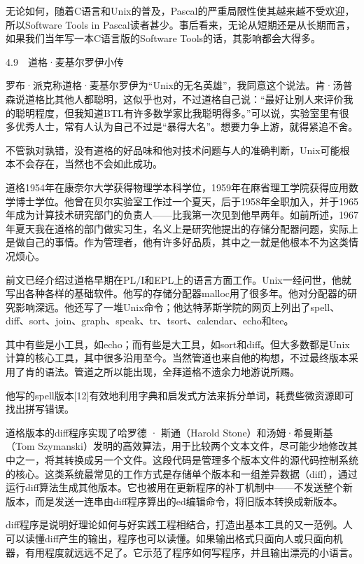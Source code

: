 \documentclass[a4paper,12pt,UTF8,twoside]{ctexbook}
\begin{document}
{无论如何，随着C语言和Unix的普及，Pascal的严重局限性使其越来越不受欢迎，所以Software Tools in Pascal读者甚少。事后看来，无论从短期还是从长期而言，如果我们当年写一本C语言版的Software Tools的话，其影响都会大得多。





4.9　道格·麦基尔罗伊小传


罗布·派克称道格·麦基尔罗伊为“Unix的无名英雄”，我同意这个说法。肯·汤普森说道格比其他人都聪明，这似乎也对，不过道格自己说：“最好让别人来评价我的聪明程度，但我知道BTL有许多数学家比我聪明得多。”可以说，实验室里有很多优秀人士，常有人认为自己不过是“暴得大名”。想要力争上游，就得紧追不舍。

不管孰对孰错，没有道格的好品味和他对技术问题与人的准确判断，Unix可能根本不会存在，当然也不会如此成功。

道格1954年在康奈尔大学获得物理学本科学位，1959年在麻省理工学院获得应用数学博士学位。他曾在贝尔实验室工作过一个夏天，后于1958年全职加入，并于1965年成为计算技术研究部门的负责人——比我第一次见到他早两年。如前所述，1967年夏天我在道格的部门做实习生，名义上是研究他提出的存储分配器问题，实际上是做自己的事情。作为管理者，他有许多好品质，其中之一就是他根本不为这类情况烦心。

前文已经介绍过道格早期在PL/I和EPL上的语言方面工作。Unix一经问世，他就写出各种各样的基础软件。他写的存储分配器malloc用了很多年。他对分配器的研究影响深远。他还写了一堆Unix命令；他达特茅斯学院的网页上列出了spell、diff、sort、join、graph、speak、tr、tsort、calendar、echo和tee。

其中有些是小工具，如echo；而有些是大工具，如sort和diff。但大多数都是Unix计算的核心工具，其中很多沿用至今。当然管道也来自他的构想，不过最终版本采用了肯的语法。管道之所以能出现，全拜道格不遗余力地游说所赐。

他写的spell版本[12]有效地利用字典和启发式方法来拆分单词，耗费些微资源即可找出拼写错误。

道格版本的diff程序实现了哈罗德 · 斯通（Harold Stone）和汤姆·希曼斯基（Tom Szymanski）发明的高效算法，用于比较两个文本文件，尽可能少地修改其中之一，将其转换成另一个文件。这段代码是管理多个版本文件的源代码控制系统的核心。这类系统最常见的工作方式是存储单个版本和一组差异数据（diff），通过运行diff算法生成其他版本。它也被用在更新程序的补丁机制中——不发送整个新版本，而是发送一连串由diff程序算出的ed编辑命令，将旧版本转换成新版本。

diff程序是说明好理论如何与好实践工程相结合，打造出基本工具的又一范例。人可以读懂diff产生的输出，程序也可以读懂。如果输出格式只面向人或只面向机器，有用程度就远远不足了。它示范了程序如何写程序，并且输出漂亮的小语言。

}
\end{document}
